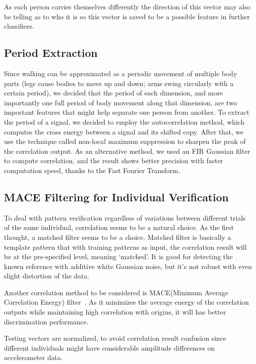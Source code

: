 \documentclass[10pt,twocolumn,letterpaper]{article}
\begin{document}
As each person carries themselves differently the direction of this vector may also be telling as to who it is so this vector is saved to be a possible feature in further classifiers.

\subsection{Period Extraction}
Since walking can be approximated as a periodic movement of multiple body parts (legs cause bodies to move up and down; arms swing circularly with a certain period), we decided that the period of each dimension, and more importantly one full period of body movement along that dimension, are two important features that might help separate one person from another. To extract the period of a signal, we decided to employ the autocorrelation method, which computes the cross energy between a signal and its shifted copy. After that, we use the technique called non-local maximum suppression to sharpen the peak of the correlation output. As an alternative method, we used an FIR Gaussian filter to compute correlation, and the result shows better precision with faster computation speed, thanks to the Fast Fourier Transform.

\subsection{MACE Filtering for Individual Verification}
To deal with pattern verification regardless of variations between different trials of the same individual, correlation seems to be a natural choice. As the first thought, a matched filter seems to be a choice. Matched filter is basically a template pattern that with training patterns as input, the correlation result will be at the pre-specified level, meaning ‘matched’. It is good for detecting the known reference with additive white Gaussian noise, but it’s not robust with even slight distortion of the data. 

Another correlation method to be considered is MACE(Minimum Average Correlation Energy) filter~\cite{Author01}. As it minimizes the average energy of the correlation outputs while maintaining high correlation with origins, it will has better discrimination performance. 

Testing vectors are normalized, to avoid correlation result confusion since different individuals might have considerable amplitude differences on accelerometer data.
\end{document}
